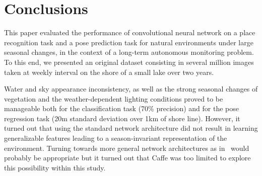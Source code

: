 \section{Conclusions}
This paper evaluated the performance of convolutional neural network on a place
recognition task and a pose prediction task for natural environments under large
seasonal changes, in the context of a long-term autonomous monitoring problem.
To this end, we presented an original dataset consisting in several million
images taken at weekly interval on the shore of a small lake over two years. 

Water and sky appearance inconsistency, as well as the strong seasonal changes
of vegetation and the weather-dependent lighting conditions proved to be
manageable both for the classification task (70\% precision) and for the pose
regression task (20m standard deviation over 1km of shore line). However, it
turned out that using the standard network architecture did not result in
learning generalizable features leading to a season-invariant representation of
the environment. Turning towards more general network architectures as
in~\cite{radford2016} would probably be appropriate but it turned out that
Caffe was too limited to explore this possibility within this study.

